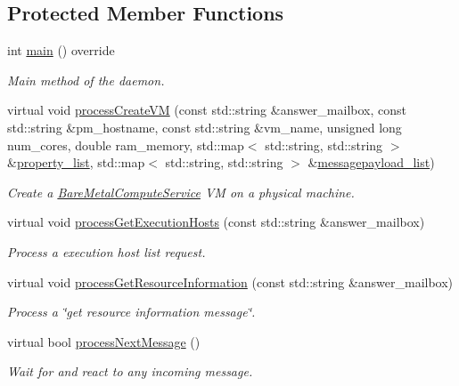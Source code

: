\subsection*{Protected Member Functions}
\begin{DoxyCompactItemize}
\item 
int \hyperlink{classwrench_1_1_cloud_service_a95f0cc4adf4ad0d33cb757f24b78e9ff}{main} () override
\begin{DoxyCompactList}\small\item\em Main method of the daemon. \end{DoxyCompactList}\item 
virtual void \hyperlink{classwrench_1_1_cloud_service_a6e0648b644dabaade3f3d746c27ea5bc}{process\+Create\+VM} (const std\+::string \&answer\+\_\+mailbox, const std\+::string \&pm\+\_\+hostname, const std\+::string \&vm\+\_\+name, unsigned long num\+\_\+cores, double ram\+\_\+memory, std\+::map$<$ std\+::string, std\+::string $>$ \&\hyperlink{classwrench_1_1_service_a032143b1e2d7296dde9b4ca1e34845ce}{property\+\_\+list}, std\+::map$<$ std\+::string, std\+::string $>$ \&\hyperlink{classwrench_1_1_service_a63865f20c92027ab626ab1347b0099d2}{messagepayload\+\_\+list})
\begin{DoxyCompactList}\small\item\em Create a \hyperlink{classwrench_1_1_bare_metal_compute_service}{Bare\+Metal\+Compute\+Service} VM on a physical machine. \end{DoxyCompactList}\item 
virtual void \hyperlink{classwrench_1_1_cloud_service_a37ac75ff0e18e6897db13586c3d3ea26}{process\+Get\+Execution\+Hosts} (const std\+::string \&answer\+\_\+mailbox)
\begin{DoxyCompactList}\small\item\em Process a execution host list request. \end{DoxyCompactList}\item 
virtual void \hyperlink{classwrench_1_1_cloud_service_a2c43daf67784bda636b77e32cdb129bd}{process\+Get\+Resource\+Information} (const std\+::string \&answer\+\_\+mailbox)
\begin{DoxyCompactList}\small\item\em Process a \char`\"{}get resource information message\char`\"{}. \end{DoxyCompactList}\item 
virtual bool \hyperlink{classwrench_1_1_cloud_service_a52eb0332c09751c66b1e778a572ad3e9}{process\+Next\+Message} ()
\begin{DoxyCompactList}\small\item\em Wait for and react to any incoming message. \end{DoxyCompactList}\item 

\end{DoxyCompactItemize}
